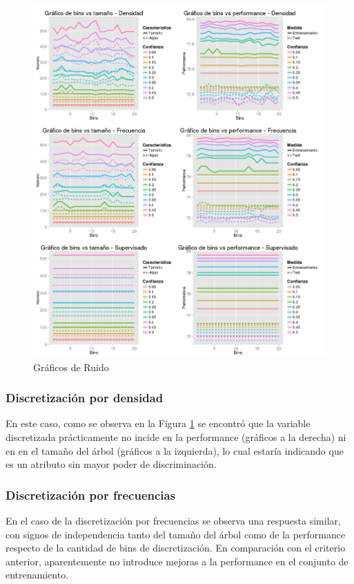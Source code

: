 \documentclass[]{article}
\begin{document}
\begin{figure}[H]
	\includegraphics[scale = 0.38]{4_1_Bins_Todas_var}
	\caption[Ruido]{Gráficos de Ruido}
	\label{4.P4Todas}
\end{figure}


\subsubsection{Discretización por densidad}
En este caso, como se observa en la Figura \ref{4.P4Todas} se encontró que la variable discretizada prácticamente no incide en la performance (gráficos a la derecha) ni en en el tamaño del árbol (gráficos a la izquierda), lo cual estaría indicando que es un atributo sin mayor poder de discriminación.

\subsubsection{Discretización por frecuencias}
En el caso de la discretización por frecuencias se observa una respuesta similar, con signos de independencia tanto del tamaño del árbol como de la performance respecto de la cantidad de bins de discretización. En comparación con el criterio anterior, aparentemente no introduce mejoras a la performance en el conjunto de entrenamiento. 
\end{document}

